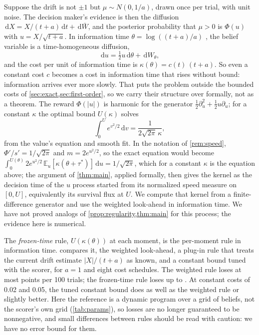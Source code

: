 \documentclass[11pt]{article}
\theoremstyle{definition}
\theoremstyle{remark}
\newcommand{\E}{\mathbb{E}}
\newcommand{\dd}{\,\mathrm{d}}
\begin{document}
Suppose the drift is not $\pm 1$ but $\mu \sim N(0, 1/a)$, drawn once per trial, with unit noise.
The decision maker's evidence is then the diffusion $\dd X = X/(t + a)\dd t + \dd\bar W$, and the
posterior probability that $\mu > 0$ is $\Phi(u)$ with $u = X/\sqrt{t + a}$. In information time
$\theta = \log((t + a)/a)$ \citep[as in][Example 8.7]{campbell2026}, the belief variable is a
time-homogeneous diffusion,
\begin{equation}
  \dd u = \tfrac12 u\dd\theta + \dd W_\theta,
\end{equation}
and the cost per unit of information time is $\kappa(\theta) = c(t)\,(t + a)$. So even a constant
cost $c$ becomes a cost in information time that rises without bound: information arrives ever
more slowly. That puts the problem outside the bounded costs of \cref{sec:exact,sec:first-order},
so we carry their structure over formally, not as a theorem. The reward $\Phi(|u|)$ is harmonic
for the generator $\tfrac12\partial_u^2 + \tfrac12 u\partial_u$; for a constant $\kappa$ the
optimal bound $U(\kappa)$ solves
\begin{equation}
  \int_0^U e^{v^2/2}\dd v = \frac{1}{2\sqrt{2\pi}\,\kappa},
\end{equation}
from the value's equation and smooth fit. In the notation of \cref{rem:speed}, $\Phi'/s' =
1/\sqrt{2\pi}$ and $m = 2e^{u^2/2}$, so the exact equation would become
$\int_0^{U(\theta)} 2e^{u^2/2}\,\E_u[\kappa(\theta + \tau^*)]\dd u = 1/\sqrt{2\pi}$, which for a
constant $\kappa$ is the equation above; the argument of \cref{thm:main}, applied formally, then gives the kernel as
the decision time of the $u$ process started from its normalized speed measure on $[0, U]$,
equivalently its survival flux at $U$. We compute that kernel from a finite-difference generator and use the weighted look-ahead in
information time. We have not proved analogs of \cref{prop:regularity,thm:main} for this process; the evidence
here is numerical.

The \emph{frozen-time} rule, $U(\kappa(\theta))$ at each moment, is the per-moment rule in
information time.  compares it, the weighted look-ahead, a plug-in rule that
treats the current drift estimate $|X|/(t + a)$ as known, and a constant bound tuned with the scorer, for
$a = 1$ and eight cost schedules. The weighted rule loses at most \UnknownWeightedMax{} points per
100 trials; the frozen-time rule loses up to \UnknownFrozenMax. At constant costs of 0.02 and 0.05,
the tuned constant bound does as well as the weighted rule or slightly
better. Here the reference is a dynamic program over a grid of beliefs, not the scorer's own grid
(\cref{tab:params}), so losses are no longer guaranteed to be nonnegative, and small differences between rules
should be read with caution: we have no error bound for them.
\end{document}
